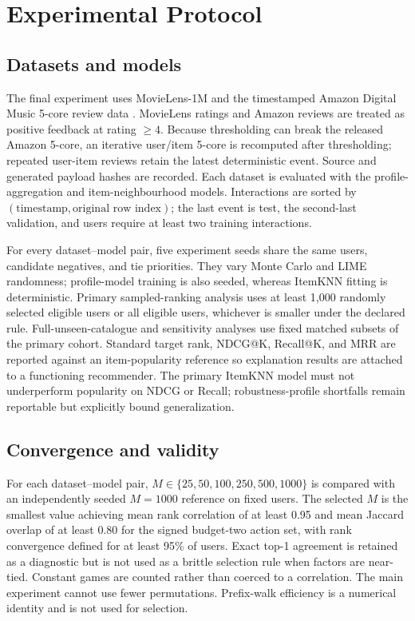 \documentclass[pdflatex,sn-basic]{sn-jnl}
\begin{document}
\section{Experimental Protocol}
\subsection{Datasets and models}
The final experiment uses MovieLens-1M \citep{harper2016} and the timestamped Amazon Digital Music 5-core review data \citep{ni2019}. MovieLens ratings and Amazon reviews are treated as positive feedback at rating $\ge4$. Because thresholding can break the released Amazon 5-core, an iterative user/item 5-core is recomputed after thresholding; repeated user-item reviews retain the latest deterministic event. Source and generated payload hashes are recorded. Each dataset is evaluated with the profile-aggregation and item-neighbourhood models. Interactions are sorted by $(\text{timestamp},\text{original row index})$; the last event is test, the second-last validation, and users require at least two training interactions.

For every dataset--model pair, five experiment seeds share the same users, candidate negatives, and tie priorities. They vary Monte Carlo and LIME randomness; profile-model training is also seeded, whereas ItemKNN fitting is deterministic. Primary sampled-ranking analysis uses at least 1,000 randomly selected eligible users or all eligible users, whichever is smaller under the declared rule. Full-unseen-catalogue and sensitivity analyses use fixed matched subsets of the primary cohort. Standard target rank, NDCG@K, Recall@K, and MRR are reported against an item-popularity reference so explanation results are attached to a functioning recommender. The primary ItemKNN model must not underperform popularity on NDCG or Recall; robustness-profile shortfalls remain reportable but explicitly bound generalization.

\subsection{Convergence and validity}
For each dataset--model pair, $M\in\{25,50,100,250,500,1000\}$ is compared with an independently seeded $M=1000$ reference on fixed users. The selected $M$ is the smallest value achieving mean rank correlation of at least 0.95 and mean Jaccard overlap of at least 0.80 for the signed budget-two action set, with rank convergence defined for at least 95\% of users. Exact top-1 agreement is retained as a diagnostic but is not used as a brittle selection rule when factors are near-tied. Constant games are counted rather than coerced to a correlation. The main experiment cannot use fewer permutations. Prefix-walk efficiency is a numerical identity and is not used for selection.
\end{document}
